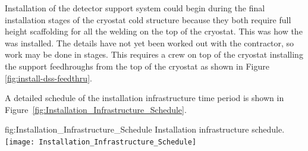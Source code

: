 Installation of the detector support system could begin during the final installation stages of the cryostat cold structure because they both require full height scaffolding for all the welding on the top of the cryostat. This was how the   was installed. The details have not yet been worked out with the contractor, so work may be done in stages. This requires a crew on top of the cryostat installing the  support feedhroughs from the top of the cryostat as shown in Figure \ref{fig:install-dss-feedthru}. 

A detailed schedule of the installation infrastructure time period is shown in Figure~\ref{fig:Installation_Infrastructure_Schedule}.
    
\begin{dunefigure}
{fig:Installation_Infrastructure_Schedule}
    {Installation infrastructure schedule.}
\texttt{[image: Installation\_Infrastructure\_Schedule]} 
\end{dunefigure}


\clearpage
